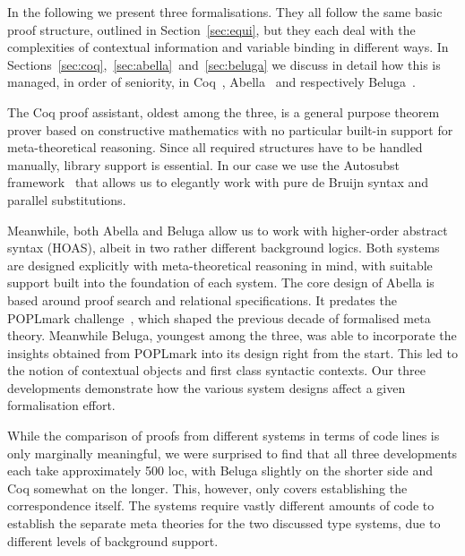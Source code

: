 \documentclass[a4paper,UKenglish]{lipics-v2016}
\theoremstyle{plain}
\begin{document}
In the following we present three formalisations.
They all follow the same basic proof structure, outlined in Section~\ref{sec:equi}, but they each deal with the complexities of contextual information and variable binding in different ways.
In Sections~\ref{sec:coq},~\ref{sec:abella}~and~\ref{sec:beluga} we discuss in detail how this is managed, in order of seniority, in Coq~\cite{CoqWebsite}, Abella~\cite{AbellaTutorial} and respectively Beluga~\cite{Pientka:CADE15}.

The Coq proof assistant, oldest among the three, is a general purpose theorem prover based on constructive mathematics with no particular built-in support for meta-theoretical reasoning.
Since all required structures have to be handled manually, library support is essential.
In our case we use the Autosubst framework~\cite{DBLP:conf/itp/SchaferTS15} that allows us to elegantly work with pure de Bruijn syntax and parallel substitutions.

Meanwhile, both Abella and Beluga allow us to work with higher-order abstract syntax (HOAS), albeit in two rather different background logics.
Both systems are designed explicitly with meta-theoretical reasoning in mind, with suitable support built into the foundation of each system.
The core design of Abella is based around proof search and relational specifications.
It predates the POPLmark challenge~\cite{poplmark}, which shaped the previous decade of formalised meta theory.
Meanwhile Beluga, youngest among the three, was able to incorporate the insights obtained from POPLmark into its design right from the start.
This led to the notion of contextual objects and first class syntactic contexts.
Our three developments demonstrate how the various system designs affect a given formalisation effort.

While the comparison of proofs from different systems in terms of code lines is only marginally meaningful, we were surprised to find that all three developments each take approximately 500 loc, with Beluga slightly on the shorter side and Coq somewhat on the longer.
This, however, only covers establishing the correspondence itself.
The systems require vastly different amounts of code to establish the separate meta theories for the two discussed type systems, due to different levels of background support.
\end{document}
